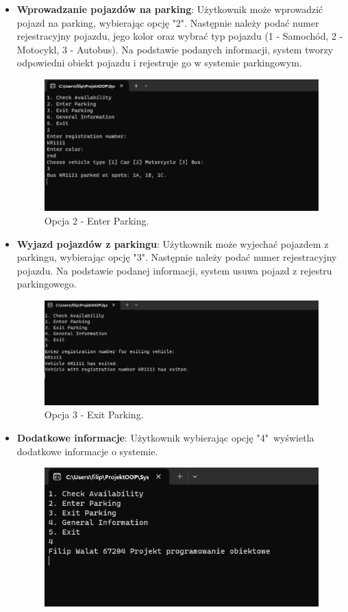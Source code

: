 \begin{itemize}
    \item \textbf{Wprowadzanie pojazdów na parking}:
    Użytkownik może wprowadzić pojazd na parking, wybierając opcję "2". Następnie należy podać numer rejestracyjny pojazdu, jego kolor oraz wybrać typ pojazdu (1 - Samochód, 2 - Motocykl, 3 - Autobus). Na podstawie podanych informacji, system tworzy odpowiedni obiekt pojazdu i rejestruje go w systemie parkingowym. 
        \begin{figure}[H]
        \centering
        \includegraphics[width=\textwidth]{photos/enter.png}
        \caption{Opcja 2 - Enter Parking.}
        \end{figure}
    \clearpage
    \item \textbf{Wyjazd pojazdów z parkingu}:
    Użytkownik może wyjechać pojazdem z parkingu, wybierając opcję "3". Następnie należy podać numer rejestracyjny pojazdu. Na podstawie podanej informacji, system usuwa pojazd z rejestru parkingowego. 
    \begin{figure}[H]
        \centering
        \includegraphics[width=\textwidth]{photos/exit.png}
        \caption{Opcja 3 - Exit Parking.}
        \end{figure}
    \item \textbf{Dodatkowe informacje}:
    Użytkownik wybierając opcję "4"\ wyświetla dodatkowe informacje o systemie.
        \begin{figure}[H]
        \centering
        \includegraphics[width=\textwidth]{photos/info.png}

\end{figure}
\end{itemize}
